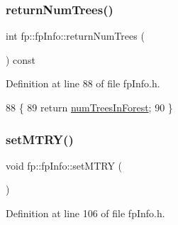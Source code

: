 \subsubsection{\texorpdfstring{return\+Num\+Trees()}{returnNumTrees()}}
{\footnotesize\ttfamily int fp\+::fp\+Info\+::return\+Num\+Trees (\begin{DoxyParamCaption}{ }\end{DoxyParamCaption}) const\hspace{0.3cm}{\ttfamily [inline]}}



Definition at line 88 of file fp\+Info.\+h.


\begin{DoxyCode}
88                                              \{
89                 \textcolor{keywordflow}{return} \hyperlink{classfp_1_1fpInfo_a8dbd62dca5c972c29d29a69d90ca2632}{numTreesInForest};
90             \}
\end{DoxyCode}
\mbox{\label{classfp_1_1fpInfo_a6b2a54fb9b3672e7b1bab3474a0ca33f}} 
\subsubsection{\texorpdfstring{set\+M\+T\+R\+Y()}{setMTRY()}}
{\footnotesize\ttfamily void fp\+::fp\+Info\+::set\+M\+T\+RY (\begin{DoxyParamCaption}{ }\end{DoxyParamCaption})\hspace{0.3cm}{\ttfamily [inline]}}



Definition at line 106 of file fp\+Info.\+h.


